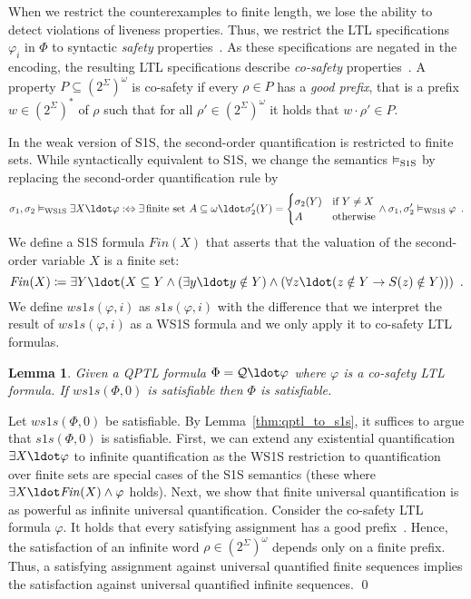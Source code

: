 \documentclass{LMCS}
\newcommand{\modelssos}{\vDash_\text{\rm S1S}}
\newcommand{\modelswsos}{\vDash_\text{\rm WS1S}}
\newcommand{\sostransformer}{\mathit{s1s}}
\newcommand{\wsostransformer}{\mathit{ws1s}}
\theoremstyle{plain}\newtheorem{theorem}[thm]{Theorem}
\theoremstyle{plain}\newtheorem{lemma}[thm]{Lemma}
\theoremstyle{plain}\newtheorem{proposition}[thm]{Proposition}
\theoremstyle{plain}\newtheorem{corollary}[thm]{Corollary}
\theoremstyle{definition}\newtheorem{definition}{Definition}[section]
\begin{document}
When we restrict the counterexamples to finite length, we lose the ability to detect violations of liveness properties.
Thus, we restrict the LTL specifications $\varphi_i$ in $\Phi$ to syntactic \emph{safety} properties~\cite{DBLP:journals/fmsd/KupfermanV01}.
As these specifications are negated in the encoding, the resulting LTL specifications describe \emph{co-safety} properties~\cite{DBLP:journals/fmsd/KupfermanV01}.
A property $P \subseteq (2^\Sigma)^\omega$ is co-safety if every $\rho \in P$ has a \emph{good prefix}, that is a prefix $w \in (2^\Sigma)^*$ of $\rho$ such that for all $\rho' \in (2^\Sigma)^\omega$ it holds that $w \cdot \rho' \in P$.

In the weak version of S1S, the second-order quantification is restricted to finite sets.
While syntactically equivalent to S1S, we change the semantics $\modelssos$ by replacing the second-order quantification rule by
\begin{equation*}
  \sigma_1,\sigma_2 \modelswsos \exists X \ldot \varphi :\Leftrightarrow \exists\,\text{finite set } A \subseteq \omega \ldot \sigma'_2(Y) = \begin{cases} \sigma_2(Y) & \text{if } Y \neq X \\ A & \text{otherwise} \end{cases} \land \sigma_1,\sigma'_2 \modelswsos \varphi \enspace.
\end{equation*}
We define a S1S formula $\mathit{Fin}(X)$ that asserts that the valuation of the second-order variable $X$ is a finite set:
\begin{equation*}
  \mathit{Fin}(X) \coloneqq \exists Y \ldot (X \subseteq Y \land (\exists y \ldot y \notin Y) \land (\forall z \ldot (z \notin Y \rightarrow S(z) \notin Y))) \enspace.
\end{equation*}
We define $\wsostransformer(\varphi, i)$ as $\sostransformer(\varphi, i)$ with the difference that we interpret the result of $\wsostransformer(\varphi, i)$ as a WS1S formula and we only apply it to co-safety LTL formulas.

\begin{lemma} \label{thm:co-safety-ws1s}
Given a QPTL formula $\Phi = \mathcal{Q} \ldot \varphi$ where $\varphi$ is a co-safety LTL formula.
If $\wsostransformer(\Phi,0)$ is satisfiable then $\Phi$ is satisfiable.
\end{lemma}
\proof
Let $\wsostransformer(\Phi,0)$ be satisfiable.
By Lemma~\ref{thm:qptl_to_s1s}, it suffices to argue that $\sostransformer(\Phi,0)$ is satisfiable.
First, we can extend any existential quantification $\exists X \ldot \varphi$ to infinite quantification as the WS1S restriction to quantification over finite sets are special cases of the S1S semantics (these where $\exists X \ldot \mathit{Fin}(X) \land \varphi$ holds).
Next, we show that finite universal quantification is as powerful as infinite universal quantification.
Consider the co-safety LTL formula $\varphi$.
It holds that every satisfying assignment has a good prefix~\cite{DBLP:journals/fmsd/KupfermanV01}.
Hence, the satisfaction of an infinite word $\rho \in (2^\Sigma)^\omega$ depends only on a finite prefix.
Thus, a satisfying assignment against universal quantified finite sequences implies the satisfaction against universal quantified infinite sequences.
\qed
\end{document}
